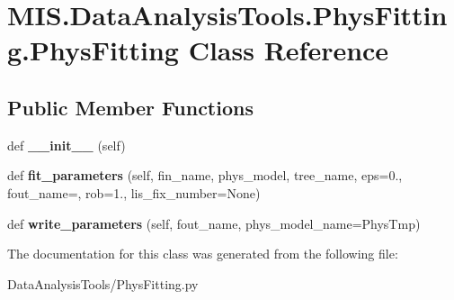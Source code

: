 \hypertarget{classMIS_1_1DataAnalysisTools_1_1PhysFitting_1_1PhysFitting}{}\section{M\+I\+S.\+Data\+Analysis\+Tools.\+Phys\+Fitting.\+Phys\+Fitting Class Reference}
\label{classMIS_1_1DataAnalysisTools_1_1PhysFitting_1_1PhysFitting}
\subsection*{Public Member Functions}
\begin{DoxyCompactItemize}
\item 
\mbox{\label{classMIS_1_1DataAnalysisTools_1_1PhysFitting_1_1PhysFitting_a3d91d6d6c54805e5877c04bf2b6a88c8}} 
def {\bfseries \+\_\+\+\_\+init\+\_\+\+\_\+} (self)
\item 
\mbox{\label{classMIS_1_1DataAnalysisTools_1_1PhysFitting_1_1PhysFitting_a6c18b0d37014496cb828a8cf42420c12}} 
def {\bfseries fit\+\_\+parameters} (self, fin\+\_\+name, phys\+\_\+model, tree\+\_\+name, eps=0., fout\+\_\+name=\textquotesingle{}\textquotesingle{}, rob=1., lis\+\_\+fix\+\_\+number=None)
\item 
\mbox{\label{classMIS_1_1DataAnalysisTools_1_1PhysFitting_1_1PhysFitting_aed2f43f4be75b12b820ef35c7f2ee7c3}} 
def {\bfseries write\+\_\+parameters} (self, fout\+\_\+name, phys\+\_\+model\+\_\+name=\textquotesingle{}Phys\+Tmp\textquotesingle{})
\end{DoxyCompactItemize}


The documentation for this class was generated from the following file\+:\begin{DoxyCompactItemize}
\item 
Data\+Analysis\+Tools/Phys\+Fitting.\+py\end{DoxyCompactItemize}

